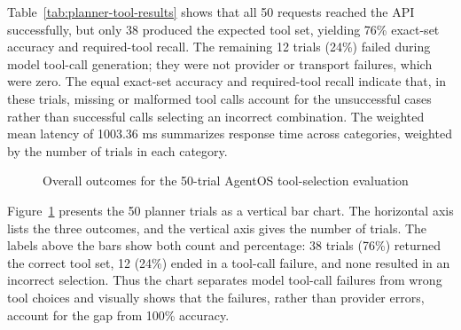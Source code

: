 Table~\ref{tab:planner-tool-results} shows that all 50 requests reached the API successfully, but only 38 produced the expected tool set, yielding 76\% exact-set accuracy and required-tool recall. The remaining 12 trials (24\%) failed during model tool-call generation; they were not provider or transport failures, which were zero. The equal exact-set accuracy and required-tool recall indicate that, in these trials, missing or malformed tool calls account for the unsuccessful cases rather than successful calls selecting an incorrect combination. The weighted mean latency of 1003.36 ms summarizes response time across categories, weighted by the number of trials in each category.

\begin{figure}[H]
\centering
{}
\caption{Overall outcomes for the 50-trial AgentOS tool-selection evaluation}
\label{fig:planner-tool-selection-overall}
\end{figure}

Figure~\ref{fig:planner-tool-selection-overall} presents the 50 planner trials as a vertical bar chart. The horizontal axis lists the three outcomes, and the vertical axis gives the number of trials. The labels above the bars show both count and percentage: 38 trials (76\%) returned the correct tool set, 12 (24\%) ended in a tool-call failure, and none resulted in an incorrect selection. Thus the chart separates model tool-call failures from wrong tool choices and visually shows that the failures, rather than provider errors, account for the gap from 100\% accuracy.

